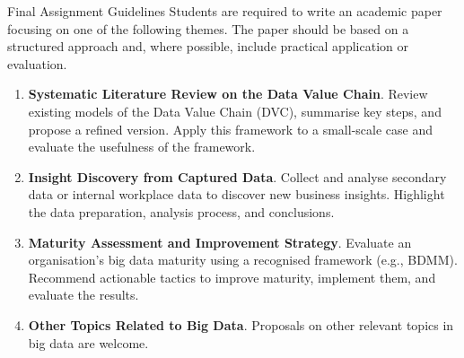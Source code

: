 \documentclass[aspectratio=169, table]{beamer}
\begin{document}
\begin{frame}[fragile]{Final Assignment Guidelines}
	\vspace{20pt}
	\small
	Students are required to write an academic paper focusing on one of the following themes. The paper should be based on a structured approach and, where possible, include practical application or evaluation.
	
	\begin{enumerate}
		\item \textbf{Systematic Literature Review on the Data Value Chain}.  
		Review existing models of the Data Value Chain (DVC), summarise key steps, and propose a refined version. Apply this framework to a small-scale case and evaluate the usefulness of the framework.
		
		\item \textbf{Insight Discovery from Captured Data}.  
		Collect and analyse secondary data or internal workplace data to discover new business insights. Highlight the data preparation, analysis process, and conclusions.
		
		\item \textbf{Maturity Assessment and Improvement Strategy}.  
		Evaluate an organisation's big data maturity using a recognised framework (e.g., BDMM). Recommend actionable tactics to improve maturity, implement them, and evaluate the results.
		
		\item \textbf{Other Topics Related to Big Data}.  
		Proposals on other relevant topics in big data are welcome.
	\end{enumerate}
\end{frame}



	
		
\end{document}
